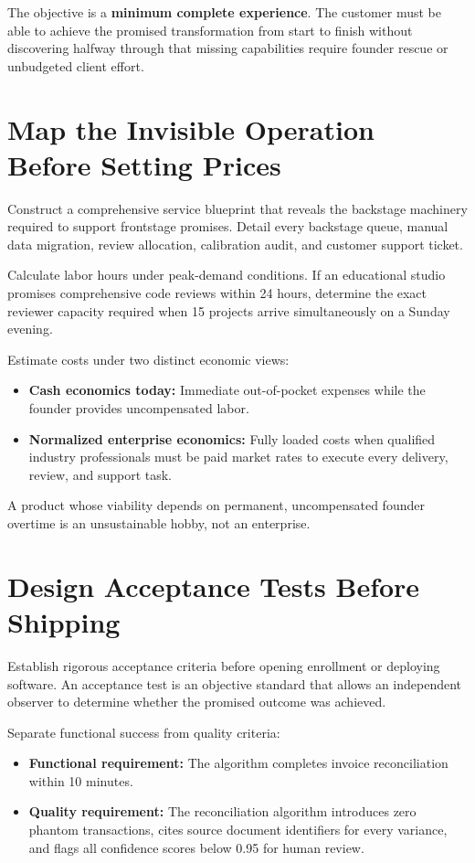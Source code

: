 The objective is a \textbf{minimum complete experience}. The customer must be able to achieve the promised transformation from start to finish without discovering halfway through that missing capabilities require founder rescue or unbudgeted client effort.

\section{Map the Invisible Operation Before Setting Prices}

Construct a comprehensive service blueprint that reveals the backstage machinery required to support frontstage promises. Detail every backstage queue, manual data migration, review allocation, calibration audit, and customer support ticket.

Calculate labor hours under peak-demand conditions. If an educational studio promises comprehensive code reviews within 24 hours, determine the exact reviewer capacity required when 15 projects arrive simultaneously on a Sunday evening. 

Estimate costs under two distinct economic views:
\begin{itemize}[leftmargin=*]
\item \textbf{Cash economics today:} Immediate out-of-pocket expenses while the founder provides uncompensated labor.
\item \textbf{Normalized enterprise economics:} Fully loaded costs when qualified industry professionals must be paid market rates to execute every delivery, review, and support task.
\end{itemize}
A product whose viability depends on permanent, uncompensated founder overtime is an unsustainable hobby, not an enterprise.

\section{Design Acceptance Tests Before Shipping}

Establish rigorous acceptance criteria before opening enrollment or deploying software. An acceptance test is an objective standard that allows an independent observer to determine whether the promised outcome was achieved.

Separate functional success from quality criteria:
\begin{itemize}[leftmargin=*]
\item \textbf{Functional requirement:} The algorithm completes invoice reconciliation within 10 minutes.
\item \textbf{Quality requirement:} The reconciliation algorithm introduces zero phantom transactions, cites source document identifiers for every variance, and flags all confidence scores below 0.95 for human review.
\end{itemize}


